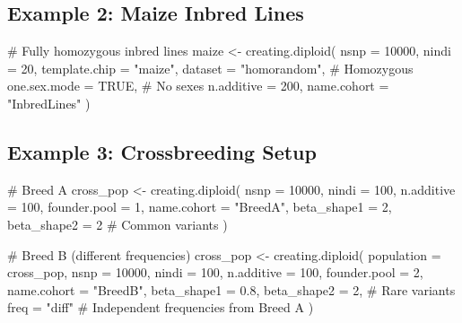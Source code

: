 \documentclass[
  letterpaper,
]{book}
\newenvironment{Shaded}{\begin{snugshade}}{\end{snugshade}}
\newcommand{\AttributeTok}[1]{\textcolor[rgb]{0.40,0.45,0.13}{#1}}
\newcommand{\CommentTok}[1]{\textcolor[rgb]{0.37,0.37,0.37}{#1}}
\newcommand{\ConstantTok}[1]{\textcolor[rgb]{0.56,0.35,0.01}{#1}}
\newcommand{\DecValTok}[1]{\textcolor[rgb]{0.68,0.00,0.00}{#1}}
\newcommand{\FloatTok}[1]{\textcolor[rgb]{0.68,0.00,0.00}{#1}}
\newcommand{\FunctionTok}[1]{\textcolor[rgb]{0.28,0.35,0.67}{#1}}
\newcommand{\NormalTok}[1]{\textcolor[rgb]{0.00,0.23,0.31}{#1}}
\newcommand{\OtherTok}[1]{\textcolor[rgb]{0.00,0.23,0.31}{#1}}
\newcommand{\StringTok}[1]{\textcolor[rgb]{0.13,0.47,0.30}{#1}}
\begin{document}
\subsection{Example 2: Maize Inbred
Lines}\label{example-2-maize-inbred-lines}

\begin{Shaded}
\begin{Highlighting}[]
\CommentTok{\# Fully homozygous inbred lines}
\NormalTok{maize }\OtherTok{\textless{}{-}} \FunctionTok{creating.diploid}\NormalTok{(}
  \AttributeTok{nsnp =} \DecValTok{10000}\NormalTok{,}
  \AttributeTok{nindi =} \DecValTok{20}\NormalTok{,}
  \AttributeTok{template.chip =} \StringTok{"maize"}\NormalTok{,}
  \AttributeTok{dataset =} \StringTok{"homorandom"}\NormalTok{,  }\CommentTok{\# Homozygous}
  \AttributeTok{one.sex.mode =} \ConstantTok{TRUE}\NormalTok{,      }\CommentTok{\# No sexes}
  \AttributeTok{n.additive =} \DecValTok{200}\NormalTok{,}
  \AttributeTok{name.cohort =} \StringTok{"InbredLines"}
\NormalTok{)}
\end{Highlighting}
\end{Shaded}

\subsection{Example 3: Crossbreeding
Setup}\label{example-3-crossbreeding-setup}

\begin{Shaded}
\begin{Highlighting}[]
\CommentTok{\# Breed A}
\NormalTok{cross\_pop }\OtherTok{\textless{}{-}} \FunctionTok{creating.diploid}\NormalTok{(}
  \AttributeTok{nsnp =} \DecValTok{10000}\NormalTok{, }\AttributeTok{nindi =} \DecValTok{100}\NormalTok{, }\AttributeTok{n.additive =} \DecValTok{100}\NormalTok{,}
  \AttributeTok{founder.pool =} \DecValTok{1}\NormalTok{, }\AttributeTok{name.cohort =} \StringTok{"BreedA"}\NormalTok{,}
  \AttributeTok{beta\_shape1 =} \DecValTok{2}\NormalTok{, }\AttributeTok{beta\_shape2 =} \DecValTok{2}  \CommentTok{\# Common variants}
\NormalTok{)}

\CommentTok{\# Breed B (different frequencies)}
\NormalTok{cross\_pop }\OtherTok{\textless{}{-}} \FunctionTok{creating.diploid}\NormalTok{(}
  \AttributeTok{population =}\NormalTok{ cross\_pop,}
  \AttributeTok{nsnp =} \DecValTok{10000}\NormalTok{, }\AttributeTok{nindi =} \DecValTok{100}\NormalTok{, }\AttributeTok{n.additive =} \DecValTok{100}\NormalTok{,}
  \AttributeTok{founder.pool =} \DecValTok{2}\NormalTok{, }\AttributeTok{name.cohort =} \StringTok{"BreedB"}\NormalTok{,}
  \AttributeTok{beta\_shape1 =} \FloatTok{0.8}\NormalTok{, }\AttributeTok{beta\_shape2 =} \DecValTok{2}\NormalTok{,  }\CommentTok{\# Rare variants}
  \AttributeTok{freq =} \StringTok{"diff"}  \CommentTok{\# Independent frequencies from Breed A}
\NormalTok{)}
\end{Highlighting}
\end{Shaded}
\end{document}
